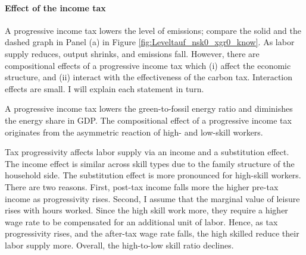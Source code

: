 \paragraph{Effect of the income tax}

 A progressive income tax lowers the level of emissions; compare the solid and the dashed graph in Panel (a) in Figure \ref{fig:Leveltauf_nsk0_xgr0_know}. As labor supply reduces, output shrinks, and emissions fall. 
 However, there are compositional effects of a progressive income tax which (i) affect the economic structure, and (ii) interact with the effectiveness of the carbon tax. Interaction effects are small. I will explain each statement in turn. 
 
 A progressive income tax lowers the green-to-fossil energy ratio and diminishes the energy share in GDP. %
 The compositional effect of a progressive income tax originates from the asymmetric reaction of high- and low-skill workers. 
 
  Tax progressivity affects labor supply via an income and a substitution effect. 
 The income effect is similar across skill types due to the family structure of the household side.
 The substitution effect is more pronounced for high-skill workers.
 There are two reasons. First, post-tax income falls more the higher pre-tax income as progressivity rises. 
 Second,  I assume that the marginal value of leisure rises with hours worked. Since the high skill work more, they require a higher wage rate to be compensated for an additional unit of labor. Hence, as tax progressivity rises, and the after-tax wage rate falls, the high skilled reduce their labor supply more.  %
 Overall, the high-to-low skill ratio declines. 
 

